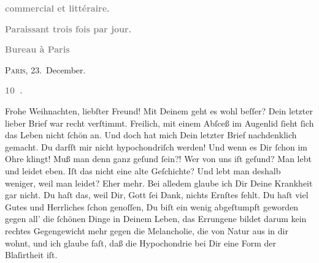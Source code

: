 \begin{ledgroupsized}[t]{13cm}
           \pstart
           \begin{otherlanguage}{french}\textcolor{gray}{\textbf{commercial et littéraire.}}\end{otherlanguage}\pend
           \pstart
           \begin{otherlanguage}{french}\textcolor{gray}{\textbf{\textbf{Paraissant trois fois par jour.}}}\end{otherlanguage}\pend
           \pstart
           \begin{otherlanguage}{french}\textcolor{gray}{\textbf{\textbf{Bureau à Paris}}}\end{otherlanguage}\hfill \textsc{Paris}, 23. December.\pend
           \pstart
           \begin{otherlanguage}{french}\textcolor{gray}{\textbf{\textbf{10 .}}}\end{otherlanguage}\pend
           \pstart{}Frohe Weihnachten, liebſter Freund!\pend\pstart
           Mit Deinem \label{K_L02834-1v}\label{K_L02834-1h}
               geht es wohl beſſer? Dein letzter lieber Brief war recht verſtimmt. Freilich, mit
               einem Abſceß im Augenlid ſieht ſich das Leben nicht ſchön an.\pend
           \pstart
           Und doch hat mich Dein letzter Brief nachdenklich gemacht. Du darfſt mir nicht
               hypochondriſch werden! Und wenn es Dir ſchon im Ohre klingt! Muß man denn ganz geſund
               ſein?! Wer von uns iſt geſund? Man lebt und leidet eben. Iſt das nicht eine alte
               Geſchichte? Und lebt man deshalb weniger, weil man leidet? Eher mehr.\pend
           \pstart
           {\pb}Bei alledem glaube ich Dir Deine Krankheit gar
               nicht. Du haſt das, weil Dir, Gott ſei Dank, nichts Ernſtes fehlt. Du haſt viel Gutes
               und Herrliches ſchon genoſſen, Du biſt ein wenig abgeſtumpft geworden gegen all’ die
               ſchönen Dinge in Deinem Leben, das Errungene bildet darum kein rechtes Gegengewicht
               mehr gegen die Melancholie, die von Natur aus in dir wohnt, und ich glaube faſt, daß
               die Hypochondrie bei Dir eine Form der Blaſirtheit iſt.\pend

\end{ledgroupsized}
